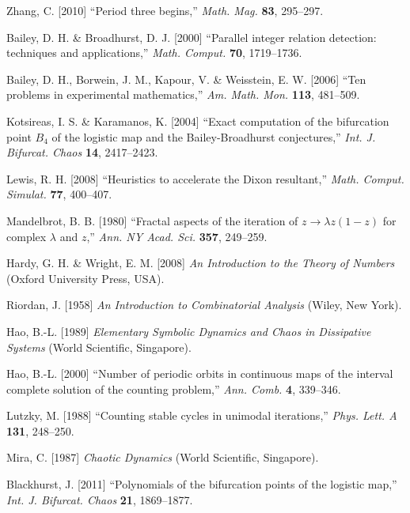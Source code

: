 \documentclass{ws-ijbc}
\begin{document}
\begin{thebibliography}{50}
  Zhang, C. [2010]
  ``Period three begins,''
  {\it Math. Mag.}
  \textbf{83},
  295--297.

  Bailey, D. H. \& Broadhurst, D. J. [2000]
  ``Parallel integer relation detection: techniques and applications,''
  {\it Math. Comput.}
  \textbf{70},
  1719--1736.

  Bailey, D. H., Borwein, J. M., Kapour, V. \& Weisstein, E. W. [2006]
  ``Ten problems in experimental mathematics,''
  {\it Am. Math. Mon.}
  \textbf{113},
  481--509.

  Kotsireas, I. S. \& Karamanos, K. [2004]
  ``Exact computation of the bifurcation point $B_4$ of the logistic map
  and  the Bailey-Broadhurst conjectures,''
  {\it Int. J. Bifurcat. Chaos}
  \textbf{14},
  2417--2423.

  Lewis, R. H. [2008]
  ``Heuristics to accelerate the Dixon resultant,''
  {\it Math. Comput. Simulat.}
  \textbf{77},
  400--407.

  Mandelbrot, B. B. [1980]
  ``Fractal aspects of the iteration of $z \rightarrow \lambda z(1-z)$
      for complex $\lambda$ and $z$,''
  {\it Ann. NY Acad. Sci.}
  \textbf{357},
  249--259.

  Hardy, G. H. \& Wright, E. M. [2008]
  {\it An Introduction to the Theory of Numbers}
  (Oxford University Press, USA).

  Riordan, J. [1958]
  {\it An Introduction to Combinatorial Analysis}
  (Wiley, New York).

  Hao, B.-L. [1989]
  {\it Elementary Symbolic Dynamics and Chaos in  Dissipative Systems}
  (World Scientific, Singapore).

  Hao, B.-L. [2000]
  ``Number of periodic orbits in continuous maps of
  the interval complete solution of the counting problem,''
  {\it Ann. Comb.}
  \textbf{4},
  339--346.

  Lutzky, M. [1988]
  ``Counting stable cycles in unimodal iterations,''
  {\it Phys. Lett. A}
  \textbf{131},
  248--250.

  Mira, C. [1987]
  {\it Chaotic Dynamics}
  (World Scientific, Singapore).

  Blackhurst, J. [2011]
  ``Polynomials of the bifurcation points of the logistic map,''
  {\it Int. J. Bifurcat. Chaos}
  \textbf{21},
  1869--1877.


\end{thebibliography}
\end{document}
